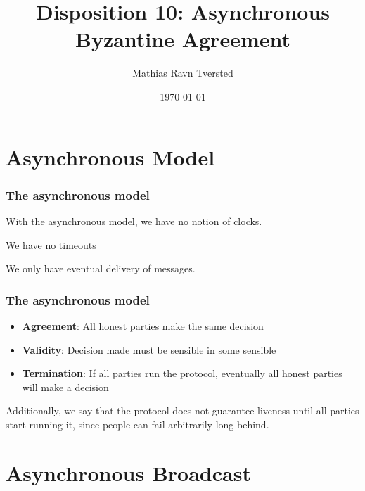 
\title{Disposition 10: Asynchronous Byzantine Agreement}   
\author{Mathias Ravn Tversted} 
\date{\today} 









\frame{\titlepage} 


\section{Asynchronous Model}
    \begin{frame}
        \frametitle{The asynchronous model}
           With the asynchronous model, we have no notion of clocks. 

           We have no timeouts

           We only have eventual delivery of messages. 
    \end{frame}

    \begin{frame}
        \frametitle{The asynchronous model}
        \begin{itemize}
            \item \textbf{Agreement}: All honest parties make the same decision
            \item \textbf{Validity}: Decision made must be sensible in some sensible
            \item \textbf{Termination}: If all parties run the protocol, eventually all honest parties will make a decision
        \end{itemize}
        Additionally, we say that the protocol does not guarantee liveness until all parties start running it, since people can fail arbitrarily long behind. 
    \end{frame}

\styleA
\section{Asynchronous Broadcast}
